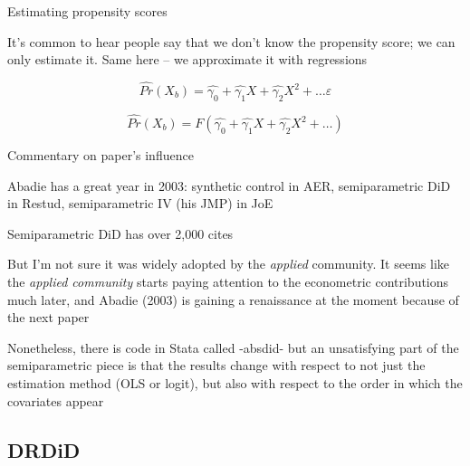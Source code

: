 \documentclass{beamer}
\begin{document}
\begin{frame}{Estimating propensity scores}

It's common to hear people say that we don't know the propensity score; we can only estimate it. Same here -- we approximate it with regressions

\bigskip

\begin{equation}
\widehat{Pr}(X_b) = \widehat{\gamma_0} + \widehat{\gamma_1}X + \widehat{\gamma_2}X^2 + \dots \varepsilon
\end{equation}

\bigskip

\begin{equation}
\widehat{Pr}(X_b) =  F(\widehat{\gamma_0} + \widehat{\gamma_1}X + \widehat{\gamma_2}X^2 + \dots)
\end{equation}

\end{frame}


\begin{frame}{Commentary on paper's influence}

Abadie has a great year in 2003: synthetic control in AER, semiparametric DiD in Restud, semiparametric IV (his JMP) in JoE

\bigskip

Semiparametric DiD has over 2,000 cites

\bigskip

But I'm not sure it was widely adopted by the \emph{applied} community. It seems like the \emph{applied community} starts paying attention to the econometric contributions much later, and Abadie (2003) is gaining a renaissance at the moment because of the next paper

\bigskip

Nonetheless, there is code in Stata called -absdid- but an unsatisfying part of the semiparametric piece is that the results change with respect to not just the estimation method (OLS or logit), but also with respect to the order in which the covariates appear

\end{frame}



\subsection{DRDiD}
\end{document}
